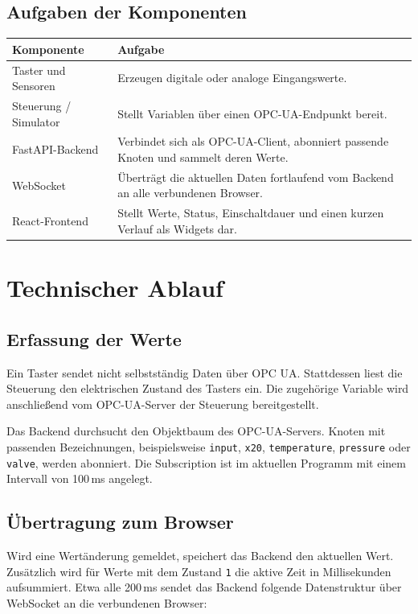 \documentclass[11pt,a4paper,parskip=half]{scrartcl}
\newcommand{\code}[1]{\texttt{#1}}
\begin{document}
\subsection{Aufgaben der Komponenten}

\begin{tabularx}{\textwidth}{@{}p{3.6cm}X@{}}
  \toprule
  \textbf{Komponente} & \textbf{Aufgabe}\\
  \midrule
  Taster und Sensoren & Erzeugen digitale oder analoge Eingangswerte.\\
  Steuerung / Simulator & Stellt Variablen über einen OPC-UA-Endpunkt bereit.\\
  FastAPI-Backend & Verbindet sich als OPC-UA-Client, abonniert passende Knoten und sammelt deren Werte.\\
  WebSocket & Überträgt die aktuellen Daten fortlaufend vom Backend an alle verbundenen Browser.\\
  React-Frontend & Stellt Werte, Status, Einschaltdauer und einen kurzen Verlauf als Widgets dar.\\
  \bottomrule
\end{tabularx}

\section{Technischer Ablauf}

\subsection{Erfassung der Werte}

Ein Taster sendet nicht selbstständig Daten über OPC UA. Stattdessen liest die Steuerung den elektrischen Zustand des Tasters ein. Die zugehörige Variable wird anschließend vom OPC-UA-Server der Steuerung bereitgestellt.

Das Backend durchsucht den Objektbaum des OPC-UA-Servers. Knoten mit passenden Bezeichnungen, beispielsweise \code{input}, \code{x20}, \code{temperature}, \code{pressure} oder \code{valve}, werden abonniert. Die Subscription ist im aktuellen Programm mit einem Intervall von 100\,ms angelegt.

\subsection{Übertragung zum Browser}

Wird eine Wertänderung gemeldet, speichert das Backend den aktuellen Wert. Zusätzlich wird für Werte mit dem Zustand \code{1} die aktive Zeit in Millisekunden aufsummiert. Etwa alle 200\,ms sendet das Backend folgende Datenstruktur über WebSocket an die verbundenen Browser:
\end{document}

